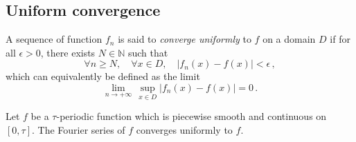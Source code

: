 \subsection{Uniform convergence}
\begin{definition}
  A sequence of function $f_n$ is said to \emph{converge uniformly} to $f$ on a domain $D$
  if for all $\epsilon>0$, there exists $N\in\mathbb{N}$ such that
  \begin{equation}
    \forall n\geq N,\quad\forall x\in D,\quad|f_n(x)-f(x)|<\epsilon\,,
  \end{equation}
  which can equivalently be defined as the limit
  \begin{equation}
    \lim_{n\to+\infty}\,\sup_{x\in D}|f_n(x)-f(x)|=0\,.
  \end{equation}
\end{definition}
\begin{theorem}
  Let $f$ be a $\tau$-periodic function which is piecewise smooth and continuous on
  $[0,\tau]$. The Fourier series of $f$ converges uniformly to $f$.
\end{theorem}
